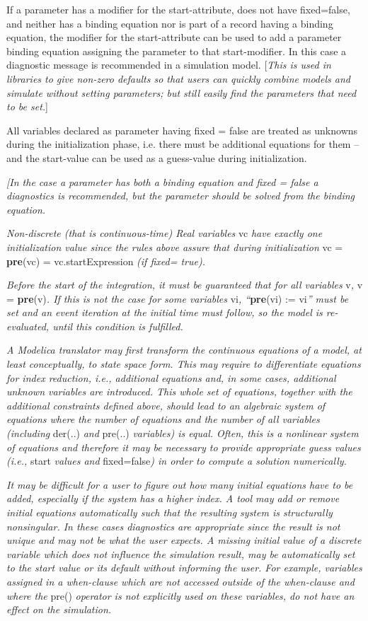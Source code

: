 \documentclass[10pt,a4paper]{report}
\begin{document}
If a parameter has a modifier for the start-attribute, does not have
fixed=false, and neither has a binding equation nor is part of a record
having a binding equation, the modifier for the start-attribute can be
used to add a parameter binding equation assigning the parameter to that
start-modifier. In this case a diagnostic message is recommended in a
simulation model. {[}\emph{This is used in libraries to give non-zero
defaults so that users can quickly combine models and simulate without
setting parameters; but still easily find the parameters that need to be
set.}{]}

All variables declared as parameter having fixed = false are treated as
unknowns during the initialization phase, i.e. there must be additional
equations for them -- and the start-value can be used as a guess-value
during initialization.

\emph{{[}In the case a parameter has both a binding equation and fixed =
false a diagnostics is recommended, but the parameter should be solved
from the binding equation.}

\emph{Non-discrete (that is continuous-time) Real variables} vc
\emph{have exactly one initialization value since the rules above assure
that during initialization} vc = \textbf{pre}(vc) = vc.startExpression
\emph{(if fixed= true).}

\emph{Before the start of the integration, it must be guaranteed that
for all variables} v\emph{,} v = \textbf{pre}(v)\emph{. If this is not
the case for some variables} vi\emph{, ``}\textbf{pre}(vi) := vi\emph{''
must be set and an event iteration at the initial time must follow, so
the model is re-evaluated, until this condition is fulfilled.}

\emph{A Modelica translator may first transform the continuous equations
of a model, at least conceptually, to state space form. This may require
to differentiate equations for index reduction, i.e., additional
equations and, in some cases, additional unknown variables are
introduced. This whole set of equations, together with the additional
constraints defined above, should lead to an algebraic system of
equations where the number of equations and the number of all variables
(including} der(..) \emph{and} pre(..) \emph{variables) is equal. Often,
this is a nonlinear system of equations and therefore it may be
necessary to provide appropriate guess values (i.e.,} start \emph{values
and} fixed=false\emph{) in order to compute a solution numerically.}

\emph{It may be difficult for a user to figure out how many initial
equations have to be added, especially if the system has a higher index.
A tool may add or remove initial equations automatically such that the
resulting system is structurally nonsingular. In these cases diagnostics
are appropriate since the result is not unique and may not be what the
user expects. A missing initial value of a discrete variable which does
not influence the simulation result, may be automatically set to the
start value or its default without informing the user. For example,
variables assigned in a when-clause which are not accessed outside of
the when-clause and where the} pre() \emph{operator is not explicitly
used on these variables, do not have an effect on the simulation.}
\end{document}
